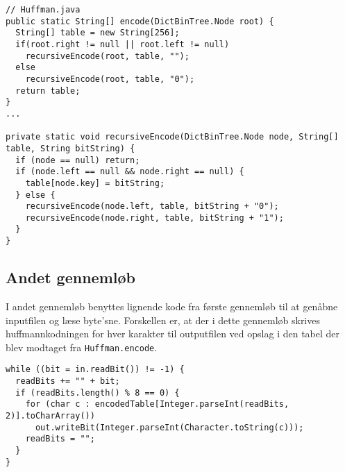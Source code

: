 \documentclass{article}
\begin{document}
\begin{lstlisting}
// Huffman.java
public static String[] encode(DictBinTree.Node root) {
  String[] table = new String[256];
  if(root.right != null || root.left != null)
    recursiveEncode(root, table, "");
  else
    recursiveEncode(root, table, "0");
  return table;
}
...

private static void recursiveEncode(DictBinTree.Node node, String[] table, String bitString) {
  if (node == null) return;
  if (node.left == null && node.right == null) {
    table[node.key] = bitString;
  } else {
    recursiveEncode(node.left, table, bitString + "0");
    recursiveEncode(node.right, table, bitString + "1");
  }
}
\end{lstlisting}

\subsection*{Andet gennemløb}

I andet gennemløb benyttes lignende kode fra første gennemløb til at genåbne inputfilen og læse byte'sne. Forskellen er, at der i dette gennemløb skrives huffmannkodningen for hver karakter til outputfilen ved opslag i den tabel der blev modtaget fra \texttt{Huffman.encode}.

\begin{lstlisting}
while ((bit = in.readBit()) != -1) {
  readBits += "" + bit;
  if (readBits.length() % 8 == 0) {
    for (char c : encodedTable[Integer.parseInt(readBits, 2)].toCharArray())
      out.writeBit(Integer.parseInt(Character.toString(c)));
    readBits = "";
  }
}
\end{lstlisting}


\newpage
\end{document}
